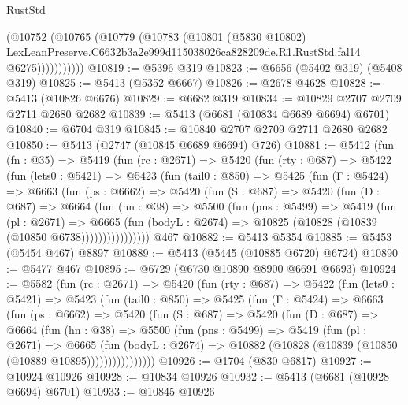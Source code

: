\begin{lexlean}{RustStd}
\begin{coremodule}
                (@10752
                  (@10765
                    (@10779
                      (@10783
                        (@10801
                          (@5830 @10802)
                          LexLeanPreserve.C6632b3a2e999d115038026ca828209de.R1.RustStd.fal14
                          @6275)))))))))))
@10819 := @5396 @319
@10823 := @6656 (@5402 @319) (@5408 @319)
@10825 := @5413 (@5352 @6667)
@10826 := @2678 @4628
@10828 := @5413 (@10826 @6676)
@10829 := @6682 @319
@10834 := @10829 @2707 @2709 @2711 @2680 @2682
@10839 := @5413 (@6681 (@10834 @6689 @6694) @6701)
@10840 := @6704 @319
@10845 := @10840 @2707 @2709 @2711 @2680 @2682
@10850 := @5413 (@2747 (@10845 @6689 @6694) @726)
@10881 := @5412
    (fun (fn : @35) =>
    @5419
      (fun (rc : @2671) =>
      @5420
        (fun (rty : @687) =>
        @5422
          (fun (lets0 : @5421) =>
          @5423
            (fun (tail0 : @850) =>
            @5425
              (fun (Γ : @5424) =>
              @6663
                (fun (ps : @6662) =>
                @5420
                  (fun (S : @687) =>
                  @5420
                    (fun (D : @687) =>
                    @6664
                      (fun (hn : @38) =>
                      @5500
                        (fun (pns : @5499) =>
                        @5419
                          (fun (pl : @2671) =>
                          @6665
                            (fun (bodyL : @2674) =>
                            @10825 (@10828 (@10839 (@10850 @6738))))))))))))))))
    @467
@10882 := @5413 @5354
@10885 := @5453 (@5454 @467) @8897
@10889 := @5413 (@5445 (@10885 @6720) @6724)
@10890 := @5477 @467
@10895 := @6729 (@6730 @10890 @8900 @6691 @6693)
@10924 := @5582
    (fun (rc : @2671) =>
    @5420
      (fun (rty : @687) =>
      @5422
        (fun (lets0 : @5421) =>
        @5423
          (fun (tail0 : @850) =>
          @5425
            (fun (Γ : @5424) =>
            @6663
              (fun (ps : @6662) =>
              @5420
                (fun (S : @687) =>
                @5420
                  (fun (D : @687) =>
                  @6664
                    (fun (hn : @38) =>
                    @5500
                      (fun (pns : @5499) =>
                      @5419
                        (fun (pl : @2671) =>
                        @6665
                          (fun (bodyL : @2674) =>
                          @10882 (@10828 (@10839 (@10850 (@10889 @10895))))))))))))))))
@10926 := @1704 (@830 @6817)
@10927 := @10924 @10926
@10928 := @10834 @10926
@10932 := @5413 (@6681 (@10928 @6694) @6701)
@10933 := @10845 @10926

\end{coremodule}
\end{lexlean}
